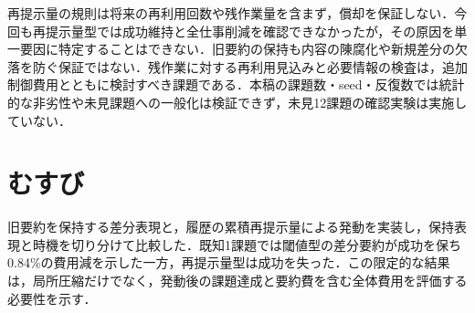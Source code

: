 \documentclass[letter]{ieicej}
\begin{document}
再提示量の規則は将来の再利用回数や残作業量を含まず，償却を保証しない．今回も再提示量型では成功維持と全仕事削減を確認できなかったが，その原因を単一要因に特定することはできない．旧要約の保持も内容の陳腐化や新規差分の欠落を防ぐ保証ではない．残作業に対する再利用見込みと必要情報の検査は，追加制御費用とともに検討すべき課題である．本稿の課題数・seed・反復数では統計的な非劣性や未見課題への一般化は検証できず，未見12課題の確認実験は実施していない．

\section{むすび}
旧要約を保持する差分表現と，履歴の累積再提示量による発動を実装し，保持表現と時機を切り分けて比較した．既知1課題では閾値型の差分要約が成功を保ち0.84\%の費用減を示した一方，再提示量型は成功を失った．この限定的な結果は，局所圧縮だけでなく，発動後の課題達成と要約費を含む全体費用を評価する必要性を示す．


\end{document}
